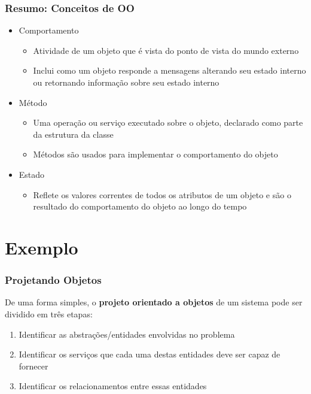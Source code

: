 \documentclass[aspectratio=169]{beamer}
\begin{document}
\begin{frame}\frametitle{Resumo: Conceitos de OO}
\begin{itemize}
	\item Comportamento
	\begin{itemize}
		\item Atividade de um objeto que é vista do ponto de vista do mundo externo
		\item Inclui como um objeto responde a mensagens alterando seu estado interno ou retornando informação sobre seu estado interno
	\end{itemize}
	\item Método
	\begin{itemize}
		\item Uma operação ou serviço executado sobre o objeto, declarado como parte da estrutura da classe
		\item Métodos são usados para implementar o comportamento do objeto
	\end{itemize}
	\item Estado
	\begin{itemize}
		\item Reflete os valores correntes de todos os atributos de um objeto e são o resultado do comportamento do objeto ao longo do tempo
	\end{itemize}
\end{itemize}
\end{frame}

\section{Exemplo}

\begin{frame}\frametitle{Projetando Objetos}
De uma forma simples, o \textbf{projeto orientado a objetos} de um sistema pode ser dividido em três etapas:
\begin{enumerate}
	\item Identificar as abstrações/entidades envolvidas no problema
	\item Identificar os serviços que cada uma destas entidades deve ser capaz de fornecer
	\item Identificar os relacionamentos entre essas entidades
\end{enumerate}
\end{frame}
\end{document}
